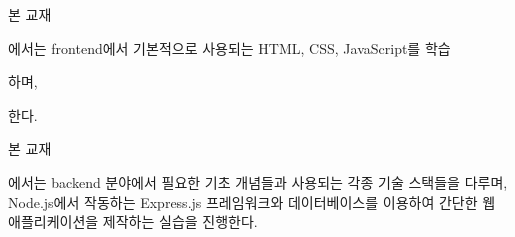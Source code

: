 
\begin{fullstack}
\end{fullstack}
\begin{frontend}
    본 교재
\end{frontend}
\begin{notbackend}
    에서는 frontend에서 기본적으로 사용되는 HTML, CSS, JavaScript를 학습
\end{notbackend}
\begin{fullstack}
    하며, 
\end{fullstack}
\begin{frontend}
    한다.
\end{frontend}
\begin{fullstack}
\end{fullstack}
\begin{backend}
    본 교재
\end{backend}
\begin{notfrontend}
    에서는 backend 분야에서 필요한 기초 개념들과 사용되는 각종 기술 스택들을 다루며, Node.js에서 작동하는 Express.js 프레임워크와 데이터베이스를 이용하여 간단한 웹 애플리케이션을 제작하는 실습을 진행한다.
\end{notfrontend}
